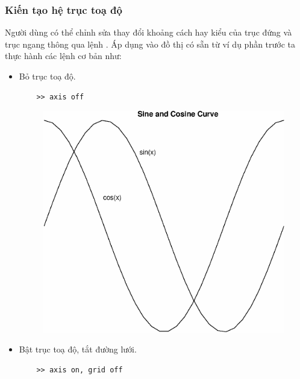 \documentclass[12pt,a4paper]{article}
\begin{document}
\subsubsection{Kiến tạo hệ trục toạ độ}
Người dùng có thể chỉnh sửa thay đổi khoảng cách hay kiểu của trục đứng và trục ngang thông qua lệnh . Áp dụng vào đồ thị có sẵn từ ví dụ phần trước ta thực hành các lệnh cơ bản như:
\begin{itemize}
	\item Bỏ trục toạ độ.
\begin{lstlisting}
	>> axis off
\end{lstlisting}
\begin{center}
	\begin{figure}[H]
	\begin{center}
		\includegraphics[scale=0.6]{hinhtieuluan/dothi8}
	\end{center}
		\caption{}
		\label{refdothi8}
	\end{figure}
\end{center}
	\item Bật trục toạ độ, tắt đường lưới.
\begin{lstlisting}
	>> axis on, grid off
\end{lstlisting}
\begin{center}
	\begin{figure}[H]
	\begin{center}

\end{center}
\end{figure}
\end{center}
\end{itemize}
\end{document}
